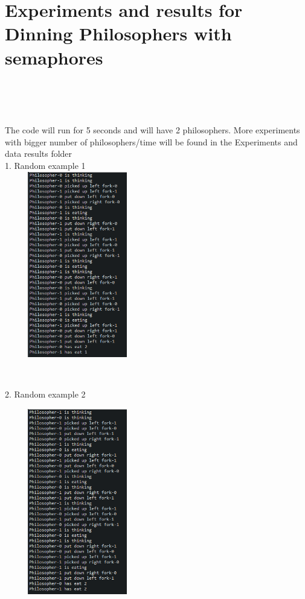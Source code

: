 \documentclass[14pt]{article}
\begin{document}
\section*{Experiments and results for Dinning Philosophers with semaphores}
\\\\\\
\begin{center}
The code will run for 5 seconds and will have 2 philosophers. More experiments with bigger number of philosophers/time will be found in the Experiments and data results folder\\
\newpage{}
1. Random example 1\\
\vspace{5mm}
\includegraphics[height=3.2in, width = 2.5in]{philosem1.png}\\
\end{center}\\

\begin{center}
2. Random example 2\\
\vspace{5mm}

\includegraphics[height=3.2in, width = 2.5in]{philosem2.png}\\
\end{center}\\
\end{document}
